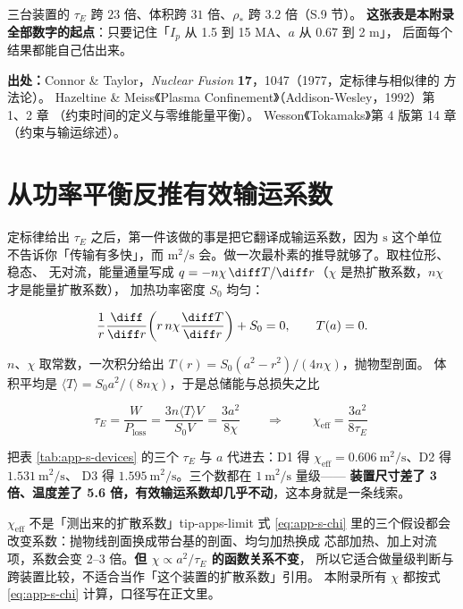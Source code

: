 三台装置的 $\tau_E$ 跨 $23$ 倍、体积跨 $31$ 倍、$\rho_\ast$ 跨 $3.2$ 倍（S.9 节）。
\textbf{这张表是本附录全部数字的起点}：只要记住「$I_p$ 从 1.5 到 15 MA、$a$ 从 0.67 到 2 m」，
后面每个结果都能自己估出来。

{\footnotesize
\textbf{出处：}Connor \& Taylor，\textit{Nuclear Fusion} \textbf{17}，1047（1977，定标律与相似律的
方法论）。
Hazeltine \& Meiss《Plasma Confinement》（Addison-Wesley，1992）第 1、2 章
（约束时间的定义与零维能量平衡）。
Wesson《Tokamaks》第 4 版第 14 章（约束与输运综述）。
}


\section{从功率平衡反推有效输运系数}
\label{sec:app-s-chi}

定标律给出 $\tau_E$ 之后，第一件该做的事是把它翻译成输运系数，因为 $\mathrm{s}$ 这个单位
不告诉你「传输有多快」，而 $\mathrm{m^2/s}$ 会。做一次最朴素的推导就够了。取柱位形、稳态、
无对流，能量通量写成 $q=-n\chi\,\diff T/\diff r$（$\chi$ 是热扩散系数，$n\chi$ 才是能量扩散系数），
加热功率密度 $S_0$ 均匀：

\begin{equation}
\frac{1}{r}\frac{\diff}{\diff r}\!\left(r\,n\chi\frac{\diff T}{\diff r}\right)+S_0=0,
\qquad T(a)=0 .
\end{equation}

$n$、$\chi$ 取常数，一次积分给出 $T(r)=S_0(a^2-r^2)/(4n\chi)$，抛物型剖面。
体积平均是 $\langle T\rangle=S_0a^2/(8n\chi)$，于是总储能与总损失之比

\begin{equation}
\tau_E=\frac{W}{P_{\mathrm{loss}}}
=\frac{3n\langle T\rangle V}{S_0V}
=\frac{3a^2}{8\chi}
\qquad\Longrightarrow\qquad
\boxed{\ \chi_{\mathrm{eff}}=\frac{3a^2}{8\tau_E}\ }
\label{eq:app-s-chi}
\end{equation}

把表 \ref{tab:app-s-devices} 的三个 $\tau_E$ 与 $a$ 代进去：D1 得
$\chi_{\mathrm{eff}}=0.606\ \mathrm{m^2/s}$、D2 得 $1.531\ \mathrm{m^2/s}$、
D3 得 $1.595\ \mathrm{m^2/s}$。三个数都在 $1\ \mathrm{m^2/s}$ 量级——
\textbf{装置尺寸差了 3 倍、温度差了 5.6 倍，有效输运系数却几乎不动}，这本身就是一条线索。

\begin{tip}{$\chi_{\mathrm{eff}}$ 不是「测出来的扩散系数」}{tip-apps-limit}
式 \eqref{eq:app-s-chi} 里的三个假设都会改变系数：抛物线剖面换成带台基的剖面、均匀加热换成
芯部加热、加上对流项，系数会变 $2$--$3$ 倍。\textbf{但 $\chi\propto a^2/\tau_E$ 的函数关系不变}，
所以它适合做量级判断与跨装置比较，不适合当作「这个装置的扩散系数」引用。
本附录所有 $\chi$ 都按式 \eqref{eq:app-s-chi} 计算，口径写在正文里。
\end{tip}

